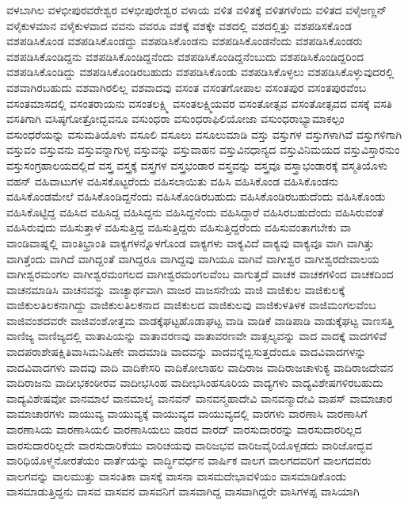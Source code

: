 {ವಳಬಾಗಿಲ
ವಳಭೀಪುರವರೇಶ್ವರ
ವಳಭೀಪುರೇಶ್ವರ
ವಳಾಯ
ವಳಿತ
ವಳಿತಕ್ಕೆ
ವಳಿತಗಳೆಂದು
ವಳಿತದ
ವಳೈಅಣ್ಣನ್
ವಳೈಕುಳಮಾನ
ವಳೈಕುಳವಾದ
ವವನು
ವವರೂ
ವಶಕ್ಕೆ
ವಶಕ್ಕೇ
ವಶದಲ್ಲಿ
ವಶದಲ್ಲಿತ್ತು
ವಶಪಡಿಸಕೊಂಡ
ವಶಪಡಿಸಿಕೊಂಡ
ವಶಪಡಿಸಿಕೊಂಡದ್ದು
ವಶಪಡಿಸಿಕೊಂಡನು
ವಶಪಡಿಸಿಕೊಂಡನೆಂದು
ವಶಪಡಿಸಿಕೊಂಡರು
ವಶಪಡಿಸಿಕೊಂಡಿದ್ದನು
ವಶಪಡಿಸಿಕೊಂಡಿದ್ದನೆಂದು
ವಶಪಡಿಸಿಕೊಂಡಿದ್ದನೆಂಬುದು
ವಶಪಡಿಸಿಕೊಂಡಿದ್ದರಿಂದ
ವಶಪಡಿಸಿಕೊಂಡಿದ್ದು
ವಶಪಡಿಸಿಕೊಂಡಿರಬಹುದು
ವಶಪಡಿಸಿಕೊಂಡು
ವಶಪಡಿಸಿಕೊಳ್ಳಲು
ವಶಪಡಿಸಿಕೊಳ್ಳುವುದರಲ್ಲಿ
ವಶವಾಗಿರಬಹುದು
ವಶವಾಗಿರಲಿಲ್ಲ
ವಶವಾದವು
ವಸಂತ
ವಸಂತಗೋಪಾಲ
ವಸಂತಪುರ
ವಸಂತಪುರವೆಂಬ
ವಸಂತಮಾಸದಲ್ಲಿ
ವಸಂತರಾಯನು
ವಸಂತಲಕ್ಷ್ಮಿ
ವಸಂತಲಕ್ಷ್ಮಿಯವರ
ವಸಂತೋತ್ಸವ
ವಸಂತೋತ್ಸವದ
ವಸಕ್ಕೆ
ವಸತಿ
ವಸತಿಗಾಗಿ
ವಸಿಷ್ಠಗೋತ್ರೋದ್ಭವನೂ
ವಸುಂಧರಾ
ವಸುಂಧರಾಫಿಲಿಯೋಜಾ
ವಸುಂಧರಾಭ್ಯಾಮಾಕಲ್ಪಂ
ವಸುಂಧರೆಯನ್ನು
ವಸುಮತಿಯೊಳು
ವಸೂಲಿ
ವಸೂಲು
ವಸೂಲುಮಾಡಿ
ವಸ್ತು
ವಸ್ತುಗಳ
ವಸ್ತುಗಳಾಗಿವೆ
ವಸ್ತುಗಳಿಗಾಗಿ
ವಸ್ತುವಂ
ವಸ್ತುವನು
ವಸ್ತುವನ್ನಾಗುಳ್ಳ
ವಸ್ತುವನ್ನು
ವಸ್ತುವಾಹನ
ವಸ್ತುವಿನಧಾನ್ಯದ
ವಸ್ತುವಿನಿಮಯದ
ವಸ್ತುವಿಸ್ತಾರನುಂ
ವಸ್ತುಸಂಗ್ರಹಾಲಯದಲ್ಲಿದೆ
ವಸ್ತ್ರ
ವಸ್ತ್ರಕ್ಕೆ
ವಸ್ತ್ರಗಳ
ವಸ್ತ್ರಭಂಡಾರ
ವಸ್ತ್ರವನ್ನು
ವಸ್ತ್ರವೂ
ವಸ್ತ್ರಾಭಂಡಾರಕ್ಕೆ
ವಸ್ಮತಿಯೊಳು
ವಹನ್
ವಹಿವಾಟುಗಳ
ವಹಿಸಕೊಟ್ಟರೆಂದು
ವಹಿಸಲಾಯಿತು
ವಹಿಸಿ
ವಹಿಸಿಕೊಂಡ
ವಹಿಸಿಕೊಂಡನು
ವಹಿಸಿಕೊಂಡಮೇಲೆ
ವಹಿಸಿಕೊಂಡಿದ್ದನೆಂದು
ವಹಿಸಿಕೊಂಡಿರಬಹುದು
ವಹಿಸಿಕೊಂಡಿರಬಹುದೆಂದು
ವಹಿಸಿಕೊಂಡು
ವಹಿಸಿಕೊಟ್ಟಿದ್ದ
ವಹಿಸಿದ
ವಹಿಸಿದ್ದ
ವಹಿಸಿದ್ದನು
ವಹಿಸಿದ್ದನೆಂದು
ವಹಿಸಿದ್ದಾರೆ
ವಹಿಸಿರಬಹುದೆಂದು
ವಹಿಸಿರುವಂತೆ
ವಹಿಸಿರುವುದು
ವಹಿಸುತ್ತಾಳೆ
ವಹಿಸುತ್ತಿದ್ದ
ವಹಿಸುತ್ತಿದ್ದರು
ವಹಿಸುತ್ತಿದ್ದರೆಂದು
ವಹಿಸುವಂತಾಗಬೇಕು
ವಾ
ವಾಂಡಿವಾಷ್ನಲ್ಲಿ
ವಾಂತಿಭ್ರಾಂತಿ
ವಾಕ್ಯಗಳನ್ನೊಳಗೊಂಡ
ವಾಕ್ಯಗಳು
ವಾಕ್ಯವಿದೆ
ವಾಕ್ಯವು
ವಾಕ್ಯವೂ
ವಾಗಿ
ವಾಗಿತ್ತು
ವಾಗಿತ್ತೆಂದು
ವಾಗಿದೆ
ವಾಗಿದ್ದಂತೆ
ವಾಗಿದ್ದರೂ
ವಾಗಿದ್ದವು
ವಾಗಿಯೂ
ವಾಗಿವೆ
ವಾಗೀಶ್ವರ
ವಾಗೀಶ್ವರದೇವಾಲಯ
ವಾಗೀಶ್ವರಮಂಗಲ
ವಾಗೀಶ್ವರಮಂಗಲದ
ವಾಗೀಶ್ವರಮಂಗಲವೆಂಬ
ವಾಗುತ್ತದೆ
ವಾಚಕ
ವಾಚಕಗಳಿಂದ
ವಾಚಕದಿಂದ
ವಾಚನಮಾಡಿಸಿ
ವಾಚನವನ್ನು
ವಾಚ್ಯಾರ್ಥವಾಗಿ
ವಾಜರ
ವಾಜಸನೇಯ
ವಾಜಿ
ವಾಜಿಕುಲ
ವಾಜಿಕುಲಕ್ಕೆ
ವಾಜಿಕುಲತಿಲಕನಾಗಿದ್ದು
ವಾಜಿಕುಲತಿಲಕನಾದ
ವಾಜಿಕುಲದ
ವಾಜಿಕುಲವು
ವಾಜಿಕುಳತಿಳಕ
ವಾಜಿಮಂಗಲವೆಂಬ
ವಾಜಿವಂಶದವರೇ
ವಾಜಿವಂಶೋತ್ತಮ
ವಾಡಕ್ಕೆಘಟ್ಟಹೊಡಾಘಟ್ಟ
ವಾಡಿ
ವಾಡಿಕೆ
ವಾಡಿಪಾಡಿ
ವಾಡುಕ್ಕೆಘಟ್ಟ
ವಾಣಸತ್ತಿ
ವಾಣಿಜ್ಯ
ವಾಣಿಜ್ಯದಲ್ಲಿ
ವಾತಾಪಿಯನ್ನು
ವಾತಾವರಣವು
ವಾತಾವರಣವೇ
ವಾತ್ಸಲ್ಯವನ್ನು
ವಾದ
ವಾದಕ್ಕೆ
ವಾದಗಳಿವೆ
ವಾದಪರಾಶೇಷಕ್ಷಿತಿವಾಸಿಮನಿಷಿಣೇ
ವಾದಮಾಡಿ
ವಾದವನ್ನು
ವಾದವನ್ನೆಬ್ಬಿಸುತ್ತದೆಂದೂ
ವಾದವಿವಾದಗಳನ್ನು
ವಾದವಿವಾದಗಳು
ವಾದವು
ವಾದಿ
ವಾದಿಕೇಸರಿ
ವಾದಿಕೋಲಾಹಲ
ವಾದಿರಾಜ
ವಾದಿರಾಜಚಾಳುಕ್ಯ
ವಾದಿರಾಜದೇವನ
ವಾದಿರಾಜನು
ವಾದೀಭಕಂಠೀರವ
ವಾದೀಭಸಿಂಹ
ವಾದೀಭಸಿಂಹಸೂರಿಯ
ವಾದ್ಯಗಳು
ವಾದ್ಯವಿಶೇಷಗಳಿರಬಹುದು
ವಾದ್ಯವಿಶೇಷವೋ
ವಾನಮಾಲೆ
ವಾನಮಾಲೈ
ವಾನವನ್
ವಾನವನ್ಮಹಾದೇವಿ
ವಾನವನ್ಮಾದೇವಿ
ವಾಪಸ್
ವಾಮಾಚಾರ
ವಾಮಾಚಾರಗಳು
ವಾಯುವ್ಯ
ವಾಯುವ್ಯಕ್ಕೆ
ವಾಯುವ್ಯದ
ವಾಯುವ್ಯದಲ್ಲಿ
ವಾರಗಳು
ವಾರಣಾಸಿ
ವಾರಣಾಸಿಗೆ
ವಾರಣಾಸಿಯ
ವಾರಣಾಸಿಯಲಿ
ವಾರಣಾಸಿಯಲು
ವಾರದ
ವಾರದ್
ವಾರಸುದಾರರನ್ನು
ವಾರಸುದಾರರಿಲ್ಲದ
ವಾರಸುದಾರರಿಲ್ಲದೇ
ವಾರಸುದಾರಿಕೆಯು
ವಾರಿಚಯವು
ವಾರಿಜಭವ
ವಾರಿಜವೈರಿಯೊಳ್ಪಡದು
ವಾರಿಜೋದ್ಭವ
ವಾರಿಧಿಯೊಳ್ಮನೋರತೆಯಂ
ವಾರ್ತೆಯನ್ನು
ವಾರ್ದ್ಧಿವರ್ಧನ
ವಾರ್ಷಿಕ
ವಾಲಗ
ವಾಲಗದವರಿಗೆ
ವಾಲಗದವರು
ವಾಲಗವನ್ನು
ವಾಲಮುತ್ತು
ವಾಸಂತಿಕಾ
ವಾಸಕ್ಕೆ
ವಾಸನಾ
ವಾಸಮದೇಭಾವಳಿಯಂ
ವಾಸಮಾಡಿಕೊಂಡು
ವಾಸಮಾಡುತ್ತಿದ್ದನು
ವಾಸವ
ವಾಸವನ
ವಾಸವನಿಗೆ
ವಾಸವಾಗಿದ್ದ
ವಾಸವಾಗಿದ್ದರೇ
ವಾಸಿಗಳಪ್ಪ
ವಾಸಿಯಾಗಿ
}
